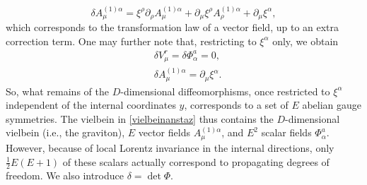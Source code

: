 \documentclass{article}
\begin{document}
\begin{equation*}
    \delta A^{(1)\alpha}_\mu= \xi^\rho\partial_\rho A^{(1)\alpha}_\mu + \partial_\mu \xi^\rho A^{(1)\alpha}_\rho +\partial_\mu \xi^\alpha,
\end{equation*}
which corresponds to the transformation law of a vector field, up to an extra correction term. One may further note that, restricting to $\xi^\alpha$ only, we obtain
\begin{subequations}
\begin{align}
&\delta V^r_\mu = \delta \Phi^a_\alpha = 0,\\
&\delta A^{(1)\alpha}_\mu = \partial_\mu \xi^\alpha.
\end{align}
\end{subequations}
So, what remains of the $D$-dimensional diffeomorphisms, once restricted to $\xi^\alpha$ independent of the internal coordinates $y$, corresponds to a set of $E$ abelian gauge symmetries.
The vielbein in \eqref{vielbeinanstaz} thus contains the $D$-dimensional vielbein (i.e., the graviton), $E$ vector fields $A^{(1)\alpha}_\mu$, and $E^2$ scalar fields $\Phi^a_\alpha$. However, because of local Lorentz invariance in the internal directions, only $\frac{1}{2}E(E+1)$ of these scalars actually correspond to propagating degrees of freedom. We also introduce $\delta = \det \Phi$. 
\end{document}
